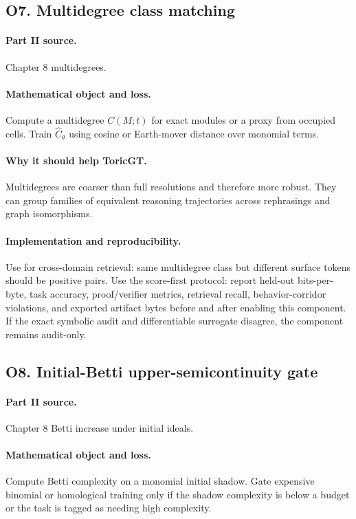 \documentclass[11pt]{article}
\theoremstyle{definition}
\begin{document}
\subsection{O7. Multidegree class matching}
\paragraph{Part II source.} Chapter 8 multidegrees.
\paragraph{Mathematical object and loss.} Compute a multidegree $C(M;t)$ for exact modules or a proxy from occupied cells.  Train $\hat C_\theta$ using cosine or Earth-mover distance over monomial terms.
\paragraph{Why it should help ToricGT.} Multidegrees are coarser than full resolutions and therefore more robust.  They can group families of equivalent reasoning trajectories across rephrasings and graph isomorphisms.
\paragraph{Implementation and reproducibility.} Use for cross-domain retrieval: same multidegree class but different surface tokens should be positive pairs.  Use the score-first protocol: report held-out bits-per-byte, task accuracy, proof/verifier metrics, retrieval recall, behavior-corridor violations, and exported artifact bytes before and after enabling this component.  If the exact symbolic audit and differentiable surrogate disagree, the component remains audit-only.


\subsection{O8. Initial-Betti upper-semicontinuity gate}
\paragraph{Part II source.} Chapter 8 Betti increase under initial ideals.
\paragraph{Mathematical object and loss.} Compute Betti complexity on a monomial initial shadow.  Gate expensive binomial or homological training only if the shadow complexity is below a budget or the task is tagged as needing high complexity.
\end{document}
